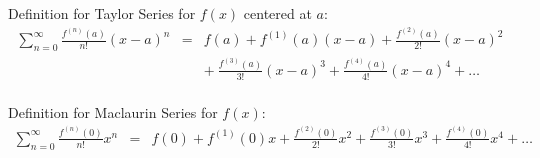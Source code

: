 %
%
%
%
%
%
%
%
%
%
%
%

\pagestyle{empty}


%

{\sc Definition for Taylor Series for \(f(x)\) centered at \(a\):}
\begin{eqnarray*}
\sum_{n=0}^\infty \frac{f^{(n)}(a)}{n!}(x-a)^n &=& f(a) + f^{(1)}(a)(x-a) + \frac{f^{(2)}(a)}{2!}(x-a)^2\\
&& +\ \frac{f^{(3)}(a)}{3!}(x-a)^3+\frac{f^{(4)}(a)}{4!}(x-a)^4+\ldots\\
\end{eqnarray*}


{\sc Definition for Maclaurin Series for \(f(x)\):}
\begin{eqnarray*}
\sum_{n=0}^\infty \frac{f^{(n)}(0)}{n!}x^n &=& f(0) + f^{(1)}(0)x 
+ \frac{f^{(2)}(0)}{2!}x^2 + \frac{f^{(3)}(0)}{3!}x^3+\frac{f^{(4)}(0)}{4!}x^4+\ldots\\
\end{eqnarray*}

